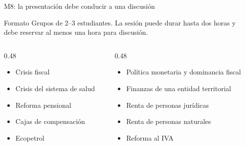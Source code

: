\documentclass{beamer}
\begin{document}
\begin{frame}{M8: la presentaci\'on debe conducir a una discusi\'on}
\small
\begin{block}{Formato}
  Grupos de 2--3 estudiantes. La sesi\'on puede durar hasta dos horas y debe reservar al menos una hora para discusi\'on.
\end{block}
\begin{columns}[T,onlytextwidth]
  \begin{column}{0.48\textwidth}
    \begin{itemize}
      \item Crisis fiscal
      \item Crisis del sistema de salud
      \item Reforma pensional
      \item Cajas de compensaci\'on
      \item Ecopetrol
    \end{itemize}
  \end{column}
  \begin{column}{0.48\textwidth}
    \begin{itemize}
      \item Pol\'itica monetaria y dominancia fiscal
      \item Finanzas de una entidad territorial
      \item Renta de personas jur\'idicas
      \item Renta de personas naturales
      \item Reforma al IVA
    \end{itemize}
  \end{column}
\end{columns}
\end{frame}
\end{document}
